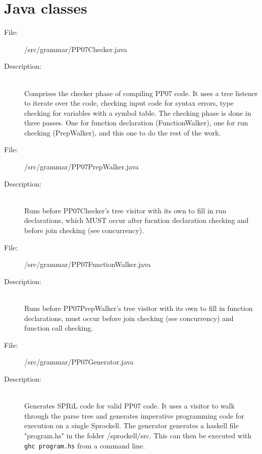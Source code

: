 \documentclass[10pt,a4paper]{report}
\begin{document}
\section{Java classes}

\begin{description}
	\item[File:] /src/grammar/PP07Checker.java
	\item[Description:] \hfill \\
		Comprises the checker phase of compiling PP07 code. It uses a tree listener to iterate over the code, checking input code for syntax errors, type checking for variables with a symbol table. The checking phase is done in three passes. One for function declaration (FunctionWalker), one for run checking (PrepWalker), and this one to do the rest of the work.
\end{description}

\begin{description}
	\item[File:] /src/grammar/PP07PrepWalker.java
	\item[Description:] \hfill \\
		Runs before PP07Checker's tree visitor with its own to fill in run declarations, which MUST occur after fucntion declaration checking and before join checking (see concurrency). 
\end{description}

\begin{description}
	\item[File:] /src/grammar/PP07FunctionWalker.java
	\item[Description:] \hfill \\
		Runs before PP07PrepWalker's tree visitor with its own to fill in function declarations, must occur before join checking (see concurrency) and function call checking. 
\end{description}

\begin{description}
	\item[File:] /src/grammar/PP07Generator.java
	\item[Description:] \hfill \\
		Generates SPRiL code for valid PP07 code. It uses a visitor to walk through the parse tree and generates imperative programming code for execution on a single Sprockell. The generator generates a haskell file "program.hs" in the folder /sprockell/src. This can then be executed with \texttt{ghc program.hs} from a command line.
\end{description}
\end{document}

